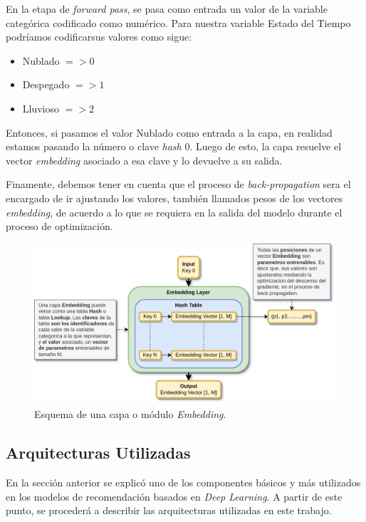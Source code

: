 \documentclass[11pt,a4paper,twoside]{thesis}
\begin{document}
En la etapa de \textit{forward pass}, se pasa como entrada un valor de la
variable categórica codificado como numérico. Para nuestra variable Estado del
Tiempo podríamos codificarsus valores como sigue:

\begin{itemize}
	\item Nublado $=> 0$
	\item Despegado $=> 1$
	\item Lluvioso $=> 2$
\end{itemize}

Entonces, si pasamos el valor Nublado como entrada a la capa, en realidad
estamos pasando la número o clave \textit{hash} $0$. Luego de esto, la capa
resuelve el vector \textit{embedding} asociado a esa clave y lo devuelve a su
salida.

Finamente, debemos tener en cuenta que el proceso de \textit{back-propagation}
sera el encargado de ir ajustando los valores, también llamados pesos de los
vectores \textit{embedding}, de acuerdo a lo que se requiera en la salida del
modelo durante el proceso de optimización.

\begin{figure}[ht!]
	\centering
	\includegraphics[width=13cm]{./images/Embedding-Layer.png}
	\caption{Esquema de una capa o módulo \textit{Embedding}.}
	\label{fig:embeddingLayer}
\end{figure}

\clearpage

\subsection{Arquitecturas Utilizadas}

En la sección anterior se explicó uno de los componentes básicos y más
utilizados en los modelos de recomendación basados en \textit{Deep Learning}. A
partir de este punto, se procederá a describir las arquitecturas utilizadas en
este trabajo.
\end{document}
